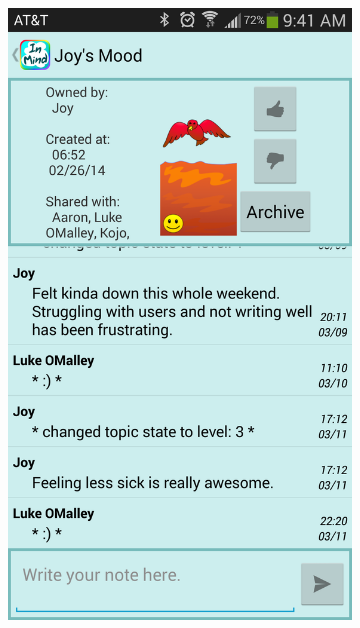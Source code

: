     \begin{figure}
      \caption{\textbf{Topic View} --
          Topic views show the topic's current status icon,
          controls available to the user,
          and messages that have been left under that topic.
          Messages have been blurred, and controls are circled in red.
          (a) If you own a topic, you can adjust its status.
          (b) On someone else's topic, you can leave a smile.
          (c) You can see only your own archived topics,
          and you can bring them back from the archive
          and read the messages attached to it.}
      \centering
      \begin{subfigure}[b]{0.3\textwidth}
        \includegraphics[width=\textwidth]{topic_view_mine.png}

\end{subfigure}
\end{figure}
